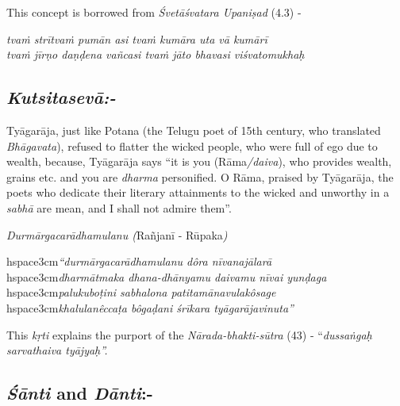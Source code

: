 This concept is borrowed from \textit{Śvetāśvatara Upaniṣad} (4.3) -

\begin{myquote}
\textit{tvaṁ strītvaṁ pumān asi tvaṁ kumāra uta vā kumārī }\\\textit{tvaṁ jīrṇo daṇḍena vañcasi tvaṁ jāto bhavasi viśvatomukhaḥ} 
\end{myquote}


\subsection*{\textit{Kutsitasevā:-}}

Tyāgarāja, just like Potana (the Telugu poet of 15th century, who translated \textit{Bhāgavata}), refused to flatter the wicked people, who were full of ego due to wealth, because, Tyāgarāja says “it is you (Rāma\textit{/daiva}), who provides wealth, grains etc. and you are \textit{dharma} personified. O Rāma, praised by Tyāgarāja, the poets who dedicate their literary attainments to the wicked and unworthy in a \textit{sabhā} are mean, and I shall not admire them”. 

\textit{Durmārgacarādhamulanu (}Rañjanī - Rūpaka\textit{)}

\begin{myquote}
hspace{3cm}\textit{“durmārgacarādhamulanu dôra nīvanajālarā}\\hspace{3cm}\textit{dharmātmaka dhana-dhānyamu daivamu nīvai yunḍaga}\\hspace{3cm}\textit{palukuboṭini sabhalona patitamānavulakôsage}\\hspace{3cm}\textit{khalulanêccaṭa bôgaḍani śrīkara tyāgarājavinuta”}
\end{myquote}

This \textit{kṛti} explains the purport of the \textit{Nārada-bhakti-sūtra} (43) - “\textit{dussaṅgaḥ sarvathaiva tyājyaḥ”.}

\vspace{-.3cm}

\subsection*{\textit{Śānti} and \textit{Dānti}:-}

